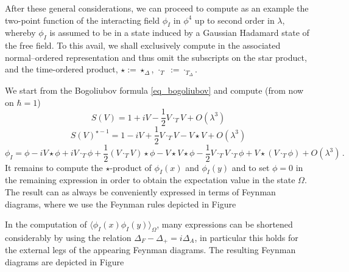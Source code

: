 \documentclass[10pt]{book}
\theoremstyle{break}
\begin{document}
After these general considerations, we can proceed to compute as an example the two-point function of the interacting field $\phi_I$ in $\phi^4$ up to second order in $\lambda$, whereby $\phi_I$ is assumed to be in a state induced by a Gaussian Hadamard state of the free field. To this avail, we shall exclusively compute in the associated normal--ordered representation and thus omit the subscripts on the star product, and the time-ordered product, $\star:=\star_\Delta$, $\cdot_T\;:=\cdot_{T_\Delta}$.


We start from the Bogoliubov formula \eqref{eq_bogoliubov} and compute (from now on $\hbar=1$)
$$
S(V)=1+iV-\frac12 V\cdot_T V + O(\lambda^3)
$$
$$
S(V)^{\star -1}=1-iV+\frac12 V\cdot_T V-V\star V + O(\lambda^3)
$$
$$
\phi_I=\phi-i V\star \phi+i V\cdot_T\phi+\frac12\left( V\cdot_T V\right)\star \phi-V\star V\star\phi-\frac12 V\cdot_T V\cdot_T \phi+V\star(V\cdot_T\phi)+O(\lambda^3)\,.
$$
It remains to compute the $\star$-product of $\phi_I(x)$ and $\phi_I(y)$ and to set $\phi=0$ in the remaining expression in order to obtain the expectation value in the state $\Omega$. The result can as always be conveniently expressed in terms of Feynman diagrams, where we use the Feynman rules depicted in Figure %


 In the computation of $\langle\phi_I(x)\phi_I(y)\rangle_\Omega$, many expressions can be shortened considerably by using the relation $\Delta_F-\Delta_+=i\Delta_A$, in particular this holds for the external legs of the appearing Feynman diagrams. The resulting Feynman diagrams are depicted in Figure %


\end{document}

